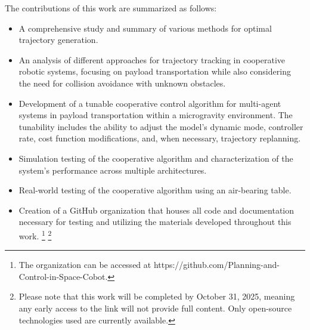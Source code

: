 The contributions of this work are summarized as follows:

\begin{itemize}
    \item A comprehensive study and summary of various methods for optimal trajectory generation.
    \item An analysis of different approaches for trajectory tracking in cooperative robotic systems, focusing on payload transportation while also considering the need for collision avoidance with unknown obstacles.
    \item Development of a tunable cooperative control algorithm for multi-agent systems in payload transportation within a microgravity environment. The tunability includes the ability to adjust the model’s dynamic mode, controller rate, cost function modifications, and, when necessary, trajectory replanning.
    \item Simulation testing of the cooperative algorithm and characterization of the system’s performance across multiple architectures.
    \item Real-world testing of the cooperative algorithm using an air-bearing table.
    \item Creation of a GitHub organization that houses all code and documentation necessary for testing and utilizing the materials developed throughout this work. \footnote{The organization can be accessed at https://github.com/Planning-and-Control-in-Space-Cobot.} \footnote{Please note that this work will be completed by October 31, 2025, meaning any early access to the link will not provide full content. Only open-source technologies used are currently available.}
\end{itemize}